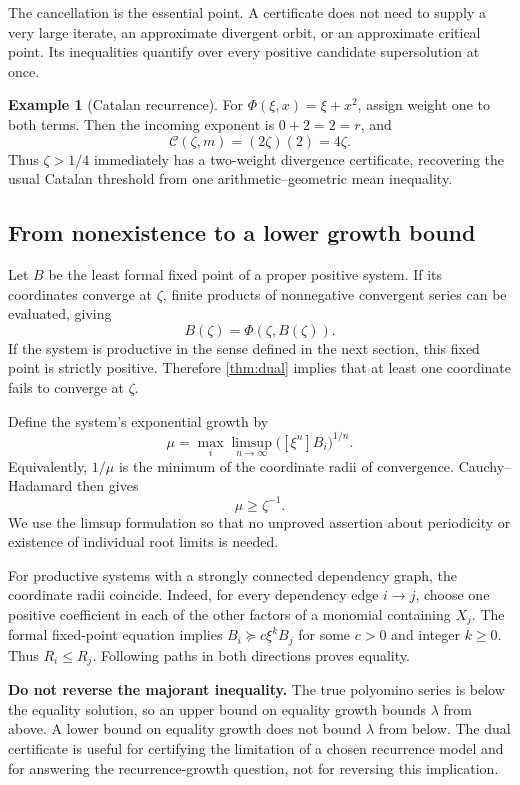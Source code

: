 \documentclass[11pt,a4paper]{article}
\theoremstyle{definition}
\newtheorem{example}[theorem]{Example}
\theoremstyle{remark}
\begin{document}
The cancellation is the essential point. A certificate does not need to
supply a very large iterate, an approximate divergent orbit, or an
approximate critical point. Its inequalities quantify over every positive
candidate supersolution at once.

\begin{example}[Catalan recurrence]
For $\Phi(\xi,x)=\xi+x^2$, assign weight one to both terms.
Then the incoming exponent is $0+2=2=r$, and
\[
 \mathcal C(\zeta,m)=(2\zeta)(2)=4\zeta.
\]
Thus $\zeta>1/4$ immediately has a two-weight divergence certificate, recovering
the usual Catalan threshold from one arithmetic--geometric mean inequality.
\end{example}

\subsection{From nonexistence to a lower growth bound}
Let $B$ be the least formal fixed point of a proper positive system. If its
coordinates converge at $\zeta$, finite products of nonnegative convergent
series can be evaluated, giving
\[
 B(\zeta)=\Phi(\zeta,B(\zeta)).
\]
If the system is productive in the sense defined in the next section, this
fixed point is strictly positive. Therefore \cref{thm:dual} implies that at
least one coordinate fails to converge at $\zeta$.

Define the system's exponential growth by
\[
 \mu=\max_i\limsup_{n\to\infty}\bigl([\xi^n]B_i\bigr)^{1/n}.
\]
Equivalently, $1/\mu$ is the minimum of the coordinate radii of convergence.
Cauchy--Hadamard then gives
\begin{equation}\label{eq:dual-growth}
 \mu\geq\zeta^{-1}.
\end{equation}
We use the limsup formulation so that no unproved assertion about periodicity
or existence of individual root limits is needed.

For productive systems with a strongly connected dependency graph, the
coordinate radii coincide. Indeed, for every dependency edge $i\to j$,
choose one positive coefficient in each of the other factors of a monomial
containing $X_j$. The formal fixed-point equation implies
$B_i\succeq c\xi^kB_j$ for some $c>0$ and integer $k\geq0$.
Thus $R_i\leq R_j$. Following paths in both directions proves equality.

\begin{resultbox}
\textbf{Do not reverse the majorant inequality.}
The true polyomino series is below the equality solution, so an upper bound
on equality growth bounds $\lambda$ from above. A lower bound on equality
growth does not bound $\lambda$ from below. The dual certificate is useful
for certifying the limitation of a chosen recurrence model and for answering
the recurrence-growth question, not for reversing this implication.
\end{resultbox}
\end{document}
